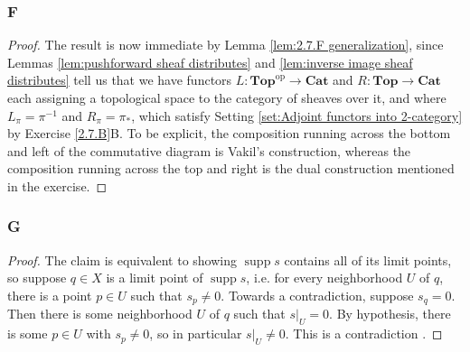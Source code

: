 \documentclass{article}
\newcommand{\Top}{\mathbf{Top}} %
\newcommand{\Cat}{\mathbf{Cat}} %
\DeclareMathOperator{\supp}{\mathrm{supp}}
\DeclareMathOperator{\op}{op}
\begin{document}
\subsubsection{F}\label{2.7.F}
\begin{proof}
    The result is now immediate by Lemma \ref{lem:2.7.F generalization}, since Lemmas \ref{lem:pushforward sheaf distributes} and \ref{lem:inverse image sheaf distributes} tell us that we have functors $L:\Top^{\op} \to \Cat$ and $R:\Top \to \Cat$ each assigning a topological space to the category of sheaves over it, and where $L_\pi = \pi^{-1}$ and $R_\pi = \pi_*$, which satisfy Setting \ref{set:Adjoint functors into 2-category} by Exercise \ref{2.7.B}B. To be explicit, the composition running across the bottom and left of the commutative diagram is Vakil's construction, whereas the composition running across the top and right is the dual construction mentioned in the exercise.
\end{proof}
\subsubsection{G}\label{2.7.G}
\begin{proof}
    The claim is equivalent to showing $\supp s$ contains all of its limit points, so suppose $q\in X$ is a limit point of $\supp s$, i.e. for every neighborhood $U$ of $q$, there is a point $p\in U$ such that $s_p\ne 0$. Towards a contradiction, suppose $s_q =0$. Then there is some neighborhood $U$ of $q$ such that $s\vert_U = 0$. By hypothesis, there is some $p\in U$ with $s_p\ne 0$, so in particular $s\vert_U \ne 0$. This is a contradiction .
\end{proof}
\end{document}
